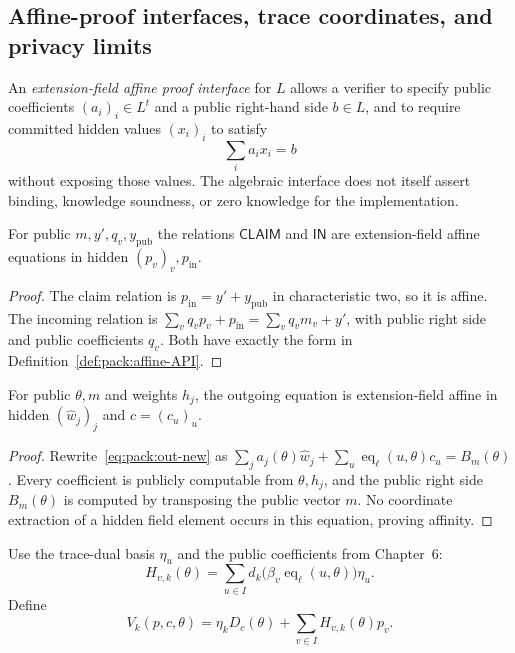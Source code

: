 \subsection{Affine-proof interfaces, trace coordinates, and privacy limits}\label{sec:packing:affine}

\begin{definition}\label{def:pack:affine-API}
An \emph{extension-field affine proof interface}
for $L$ allows a verifier to specify public
coefficients $(a_i)_i\in L^t$ and a public
right-hand side $b\in L$, and to require
committed hidden values $(x_i)_i$ to satisfy
\[
 \sum_i a_ix_i=b
\]
without exposing those values.
The algebraic interface does not itself
assert binding, knowledge soundness, or
zero knowledge for the implementation.
\end{definition}

\begin{lemma}\label{lem:pack:IN-affine}
For public $m,y',q_v,y_{\mathrm{pub}}$
the relations $\mathsf{CLAIM}$
and $\mathsf{IN}$ are extension-field
affine equations in hidden
$(p_v)_v,p_{\mathrm{in}}$.
\end{lemma}
\begin{proof}
The claim relation is
$p_{\mathrm{in}}=y'+y_{\mathrm{pub}}$
in characteristic two, so it is affine.
The incoming relation is
$\sum_vq_vp_v+p_{\mathrm{in}}
 =\sum_vq_vm_v+y'$,
with public right side and public
coefficients $q_v$. Both have exactly
the form in Definition~\ref{def:pack:affine-API}.
\end{proof}

\begin{lemma}\label{lem:pack:OUT-affine}
For public $\theta,m$ and weights
$h_j$, the outgoing equation is
extension-field affine in hidden
$(\widehat w_j)_j$ and $c=(c_u)_u$.
\end{lemma}
\begin{proof}
Rewrite~\eqref{eq:pack:out-new} as
$\sum_ja_j(\theta)\widehat w_j+
  \sum_u\operatorname{eq}_\ell(u,\theta)c_u
  =B_m(\theta)$.
Every coefficient is publicly
computable from $\theta,h_j$,
and the public right side
$B_m(\theta)$ is computed by
transposing the public vector $m$.
No coordinate extraction of
a hidden field element occurs
in this equation, proving affinity.
\end{proof}

\begin{definition}\label{def:pack:affine-H}
Use the trace-dual basis $\eta_u$ and
the public coefficients from Chapter~6:
\[
 H_{v,k}(\theta)
 =\sum_{u\in I}
    d_k\bigl(\beta_v\operatorname{eq}_\ell(u,\theta)\bigr)
    \eta_u.
\]
Define
\[
 V_k(p,c,\theta)
 =\eta_kD_c(\theta)+
       \sum_{v\in I}H_{v,k}(\theta)p_v.
\]
\end{definition}


